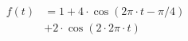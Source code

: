 \begin{center}
\begin{align*}
f(t) &= 1 + 4 \cdot \cos( 2 \pi \cdot t - \pi/4) \\
&+ 2 \cdot \cos( 2 \cdot 2 \pi \cdot t )
\end{align*}
\end{center}
